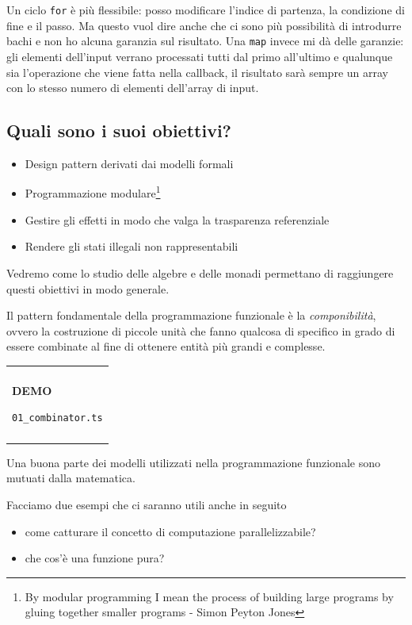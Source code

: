 \documentclass[12pt]{article}
\theoremstyle{definition}
\newenvironment{demo}
    {\begin{center}
    \begin{tabular}{|p{0.9\textwidth}|}
    \hline\\
    }
    {
    \\\\\hline
    \end{tabular}
    \end{center}
    }
\begin{document}
Un ciclo \texttt{for} è più flessibile: posso modificare l'indice di partenza, la condizione di fine e il passo.
Ma questo vuol dire anche che ci sono più possibilità di introdurre bachi e non ho alcuna garanzia sul risultato.
Una \texttt{map} invece mi dà delle garanzie: gli elementi dell'input verrano processati tutti dal primo all'ultimo e
qualunque sia l'operazione che viene fatta nella callback, il risultato sarà sempre un array con lo stesso numero di elementi
dell'array di input.

\subsection{Quali sono i suoi obiettivi?}

\begin{itemize}
  \item Design pattern derivati dai modelli formali
  \item Programmazione modulare\footnote{By modular programming I mean the process of building large programs by gluing together smaller programs - Simon Peyton Jones}
  \item Gestire gli effetti in modo che valga la trasparenza referenziale
  \item Rendere gli stati illegali non rappresentabili
\end{itemize}

Vedremo come lo studio delle algebre e delle monadi permettano di raggiungere questi obiettivi in modo generale.

Il pattern fondamentale della programmazione funzionale è la \emph{componibilità}, ovvero la costruzione di piccole unità
che fanno qualcosa di specifico in grado di essere combinate al fine di ottenere entità più grandi e complesse.

\begin{demo}
\begin{center}
\textbf{DEMO}

\texttt{01\_combinator.ts}
\end{center}
\end{demo}

Una buona parte dei modelli utilizzati nella programmazione funzionale sono mutuati dalla matematica.

Facciamo due esempi che ci saranno utili anche in seguito

\begin{itemize}
  \item come catturare il concetto di computazione parallelizzabile?
  \item che cos'è una funzione pura?
\end{itemize}
\end{document}
